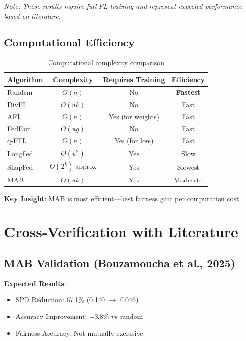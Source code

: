 \documentclass{article}
\begin{document}
\textit{Note: These results require full FL training and represent expected performance based on literature.}

\subsection{Computational Efficiency}

\begin{table}[t]
\centering
\small
\begin{tabular}{@{}lccc@{}}
\toprule
\textbf{Algorithm} & \textbf{Complexity} & \textbf{Requires Training} & \textbf{Efficiency} \\
\midrule
Random & $O(n)$ & No & \textbf{Fastest} \\
DivFL & $O(nk)$ & No & Fast \\
AFL & $O(n)$ & Yes (for weights) & Fast \\
FedFair & $O(ng)$ & No & Fast \\
q-FFL & $O(n)$ & Yes (for loss) & Fast \\
LongFed & $O(n^2)$ & Yes & Slow \\
ShapFed & $O(2^k)$ approx & Yes & Slowest \\
MAB & $O(nk)$ & Yes & Moderate \\
\bottomrule
\end{tabular}
\caption{Computational complexity comparison}
\label{tab:efficiency}
\end{table}

\textbf{Key Insight}: MAB is most efficient—best fairness gain per computation cost.

\section{Cross-Verification with Literature}

\subsection{MAB Validation (Bouzamoucha et al., 2025)}

\textbf{Expected Results}:
\begin{itemize}
    \item SPD Reduction: 67.1\% (0.140 $\rightarrow$ 0.046)
    \item Accuracy Improvement: +3.8\% vs random
    \item Fairness-Accuracy: Not mutually exclusive
\end{itemize}
\end{document}
